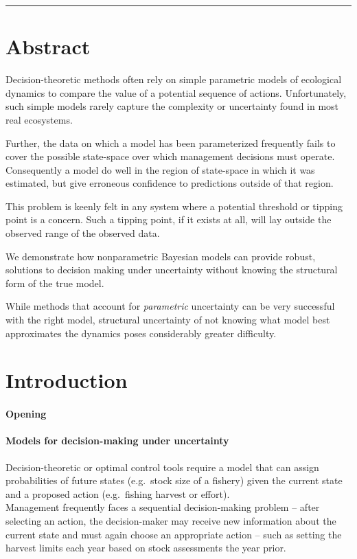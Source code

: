 \documentclass[author-year, review]{elsarticle} %
\begin{document}
\begin{center}\rule{3in}{0.4pt}\end{center}

\section{Abstract}\label{abstract-1}

Decision-theoretic methods often rely on simple parametric models of
ecological dynamics to compare the value of a potential sequence of
actions. Unfortunately, such simple models rarely capture the complexity
or uncertainty found in most real ecosystems.

Further, the data on which a model has been parameterized frequently
fails to cover the possible state-space over which management decisions
must operate. Consequently a model do well in the region of state-space
in which it was estimated, but give erroneous confidence to predictions
outside of that region.

This problem is keenly felt in any system where a potential threshold or
tipping point is a concern. Such a tipping point, if it exists at all,
will lay outside the observed range of the observed data.

We demonstrate how nonparametric Bayesian models can provide robust,
solutions to decision making under uncertainty without knowing the
structural form of the true model.

While methods that account for \emph{parametric} uncertainty can be very
successful with the right model, structural uncertainty of not knowing
what model best approximates the dynamics poses considerably greater
difficulty.

\section{Introduction}\label{introduction-1}

\paragraph{Opening}\label{opening}

\paragraph{Models for decision-making under
uncertainty}\label{models-for-decision-making-under-uncertainty}

Decision-theoretic or optimal control tools require a model that can
assign probabilities of future states (e.g.~stock size of a fishery)
given the current state and a proposed action (e.g.~fishing harvest or
effort).\\Management frequently faces a sequential decision-making
problem -- after selecting an action, the decision-maker may receive new
information about the current state and must again choose an appropriate
action -- such as setting the harvest limits each year based on stock
assessments the year prior.
\end{document}

